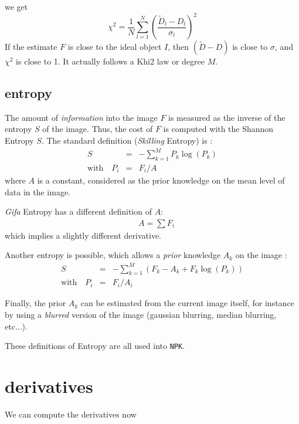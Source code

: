 \documentclass[]{article}
\begin{document}
we get
\begin{equation}
		\chi^2 = \frac 1 N \sum_{l=1}^{N}\left (\frac{\tilde{D}_l-D_l}{\sigma_l}\right )^2
\end{equation}
If the estimate $F$ is close to the ideal object $I$, then $(\tilde{D}-D)$ is close to $\sigma$, and $\chi^2$ is close to 1. It actually follows a Khi2 law or degree $M$.
\subsection{entropy} %
The amount of \emph{information} into the image $F$ is measured as the inverse of the entropy $S$ of the image.
Thus, the cost of $F$ is computed with the Shannon Entropy $S$.
The standard definition (\emph{Skilling} Entropy) is :
\begin{eqnarray}
	S &=& -\sum_{k=1}^{M}P_k \log(P_k) \\
  \mbox{with} \quad P_i &=& F_i / A
\end{eqnarray}
where $A$ is a constant, considered as the prior knowledge on the mean level of data in the image.

\emph{Gifa} Entropy has a different definition of $A$:
\begin{eqnarray}
 \quad A = \sum F_i
\end{eqnarray}
which implies a slightly different derivative.

Another entropy is possible, which allows a \emph{prior} knowledge $A_k$ on the image :
\begin{eqnarray}
	S &=& -\sum_{k=1}^{M} ( F_k - A_k + F_k \log(P_k) ) \\
  \mbox{with} \quad P_i &=& F_i / A_i
\end{eqnarray}

Finally, the prior $A_k$ can be estimated from the current image itself, for instance by using a \emph{blurred} version of the image (gaussian blurring, median blurring, etc...). 

These definitions of Entropy are all used into \texttt{NPK}.

\section{derivatives} %
We can compute the derivatives now
\end{document}
